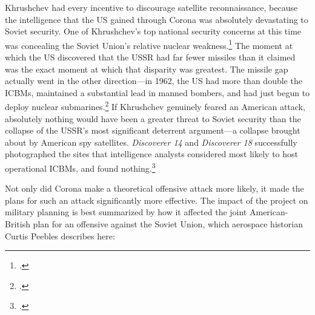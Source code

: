 \documentclass[12pt]{extarticle}
\begin{document}
Khrushchev had every incentive to discourage satellite reconnaissance, because the intelligence that the US gained through Corona was absolutely devastating to Soviet security. One of Khrushchev's top national security concerns at this time was concealing the Soviet Union's relative nuclear weakness.\footcite[133]{brugioni_eyes_2010} The moment at which the US discovered that the USSR had far fewer missiles than it claimed was the exact moment at which that disparity was greatest. The missile gap actually went in the other direction---in 1962, the US had more than double the ICBMs, maintained a substantial lead in manned bombers, and had just begun to deploy nuclear submarines.\footcite[251]{mcdougall_heavens_1985} If Khrushchev genuinely feared an American attack, absolutely nothing would have been a greater threat to Soviet security than the collapse of the USSR's most significant deterrent argument---a collapse brought about by American spy satellites. \emph{Discoverer 14} and \emph{Discoverer 18} successfully photographed the sites that intelligence analysts considered most likely to host operational ICBMs, and found nothing.\footcite[379]{brugioni_eyes_2010}




Not only did Corona make a theoretical offensive attack more likely, it made the plans for such an attack significantly more effective. The impact of the project on military planning is best summarized by how it affected the joint American-British plan for an offensive against the Soviet Union, which aerospace historian Curtis Peebles describes here:
\end{document}
